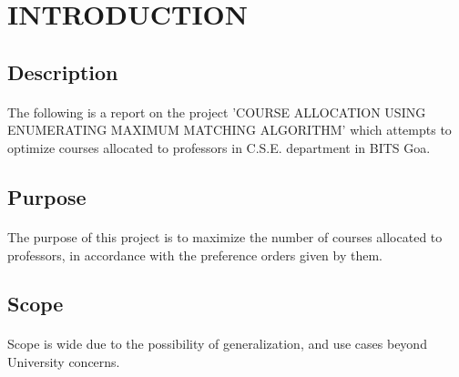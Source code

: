 
\section{INTRODUCTION}
\subsection{Description}
\paragraph{}

The following is a report on the project 'COURSE ALLOCATION USING ENUMERATING MAXIMUM MATCHING ALGORITHM' which attempts to optimize courses allocated to professors in C.S.E. department in BITS Goa.

\subsection{Purpose}
\paragraph{}The purpose of this project is to maximize the number of courses allocated to professors, in accordance with the preference orders given by them. 

\subsection{Scope}
\paragraph{} Scope is wide due to the possibility of generalization, and use cases beyond University concerns.



